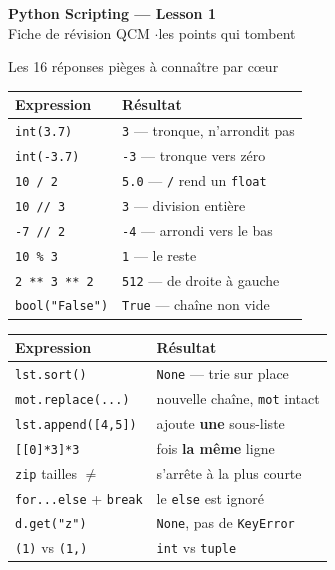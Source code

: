 \documentclass[a4paper,10pt]{article}
\newcommand{\co}[1]{\texttt{\textcolor{codefg}{#1}}}
\begin{document}

\small

\begin{center}
  {\LARGE\bfseries\color{accent} Python Scripting --- Lesson 1}\\[0.3em]
  {\normalsize Fiche de révision QCM \quad$\cdot$\quad les points qui tombent}
\end{center}
\vspace{0.4em}

\begin{piegebox}{Les 16 réponses pièges à connaître par c\oe ur}
\begin{minipage}[t]{0.485\linewidth}
\begin{tabularx}{\linewidth}{@{}l>{\raggedright\arraybackslash}X@{}}
\toprule
\textbf{Expression} & \textbf{Résultat} \\
\midrule
\co{int(3.7)}      & \co{3} --- tronque, n'arrondit pas \\
\co{int(-3.7)}     & \co{-3} --- tronque vers zéro \\
\co{10 / 2}        & \co{5.0} --- \co{/} rend un \co{float} \\
\co{10 // 3}       & \co{3} --- division entière \\
\co{-7 // 2}       & \co{-4} --- arrondi vers le bas \\
\co{10 \% 3}       & \co{1} --- le reste \\
\co{2 ** 3 ** 2}   & \co{512} --- de droite à gauche \\
\co{bool("False")} & \co{True} --- chaîne non vide \\
\bottomrule
\end{tabularx}
\end{minipage}\hfill
\begin{minipage}[t]{0.485\linewidth}
\begin{tabularx}{\linewidth}{@{}l>{\raggedright\arraybackslash}X@{}}
\toprule
\textbf{Expression} & \textbf{Résultat} \\
\midrule
\co{lst.sort()}        & \co{None} --- trie sur place \\
\co{mot.replace(...)}  & nouvelle chaîne, \co{mot} intact \\
\co{lst.append([4,5])} & ajoute \textbf{une} sous-liste \\
\co{[[0]*3]*3}         & 3 fois \textbf{la même} ligne \\
\co{zip} tailles $\neq$ & s'arrête à la plus courte \\
\co{for...else} + \co{break} & le \co{else} est ignoré \\
\co{d.get("z")}        & \co{None}, pas de \co{KeyError} \\
\co{(1)} vs \co{(1,)}  & \co{int} vs \co{tuple} \\
\bottomrule
\end{tabularx}
\end{minipage}
\end{piegebox}
\end{document}
